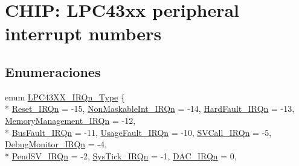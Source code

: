\hypertarget{group___c_m_s_i_s__43_x_x___i_r_q}{}\section{C\+H\+IP\+: L\+P\+C43xx peripheral interrupt numbers}
\label{group___c_m_s_i_s__43_x_x___i_r_q}
\subsection*{Enumeraciones}
\begin{DoxyCompactItemize}
\item 
enum \hyperlink{group___c_m_s_i_s__43_x_x___i_r_q_ga2018a6433701e9ee9b34797425127919}{L\+P\+C43\+X\+X\+\_\+\+I\+R\+Qn\+\_\+\+Type} \{ \\*
\hyperlink{group___c_m_s_i_s__43_x_x___i_r_q_gga2018a6433701e9ee9b34797425127919a50ad21f2fd0d54d04b390d5a9145889a}{Reset\+\_\+\+I\+R\+Qn} = -\/15, 
\hyperlink{group___c_m_s_i_s__43_x_x___i_r_q_gga2018a6433701e9ee9b34797425127919ade177d9c70c89e084093024b932a4e30}{Non\+Maskable\+Int\+\_\+\+I\+R\+Qn} = -\/14, 
\hyperlink{group___c_m_s_i_s__43_x_x___i_r_q_gga2018a6433701e9ee9b34797425127919ab1a222a34a32f0ef5ac65e714efc1f85}{Hard\+Fault\+\_\+\+I\+R\+Qn} = -\/13, 
\hyperlink{group___c_m_s_i_s__43_x_x___i_r_q_gga2018a6433701e9ee9b34797425127919a33ff1cf7098de65d61b6354fee6cd5aa}{Memory\+Management\+\_\+\+I\+R\+Qn} = -\/12, 
\\*
\hyperlink{group___c_m_s_i_s__43_x_x___i_r_q_gga2018a6433701e9ee9b34797425127919a8693500eff174f16119e96234fee73af}{Bus\+Fault\+\_\+\+I\+R\+Qn} = -\/11, 
\hyperlink{group___c_m_s_i_s__43_x_x___i_r_q_gga2018a6433701e9ee9b34797425127919a6895237c9443601ac832efa635dd8bbf}{Usage\+Fault\+\_\+\+I\+R\+Qn} = -\/10, 
\hyperlink{group___c_m_s_i_s__43_x_x___i_r_q_gga2018a6433701e9ee9b34797425127919a4ce820b3cc6cf3a796b41aadc0cf1237}{S\+V\+Call\+\_\+\+I\+R\+Qn} = -\/5, 
\hyperlink{group___c_m_s_i_s__43_x_x___i_r_q_gga2018a6433701e9ee9b34797425127919a8e033fcef7aed98a31c60a7de206722c}{Debug\+Monitor\+\_\+\+I\+R\+Qn} = -\/4, 
\\*
\hyperlink{group___c_m_s_i_s__43_x_x___i_r_q_gga2018a6433701e9ee9b34797425127919a03c3cc89984928816d81793fc7bce4a2}{Pend\+S\+V\+\_\+\+I\+R\+Qn} = -\/2, 
\hyperlink{group___c_m_s_i_s__43_x_x___i_r_q_gga2018a6433701e9ee9b34797425127919a6dbff8f8543325f3474cbae2446776e7}{Sys\+Tick\+\_\+\+I\+R\+Qn} = -\/1, 
\hyperlink{group___c_m_s_i_s__43_x_x___i_r_q_gga2018a6433701e9ee9b34797425127919afe396b0c790fb592adb3813c718d2dcd}{D\+A\+C\+\_\+\+I\+R\+Qn} = 0, 

\end{DoxyCompactItemize}
